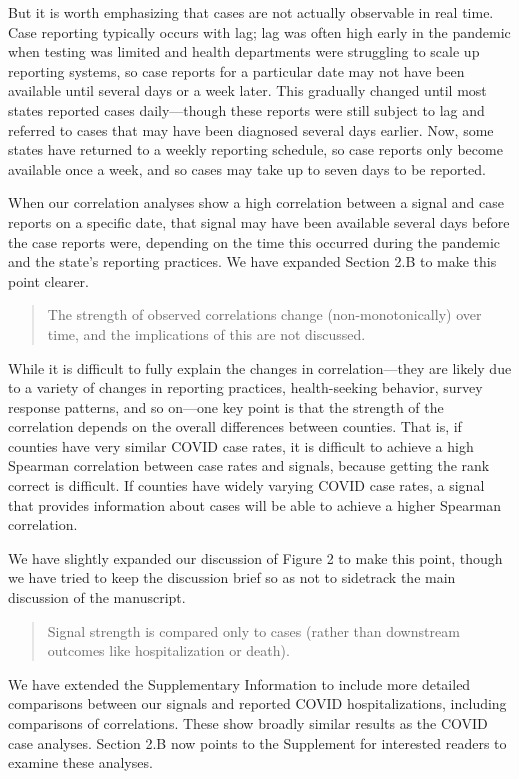 \documentclass[11pt]{article}
\begin{document}
But it is worth emphasizing that cases are not actually observable in real time.
Case reporting typically occurs with lag; lag was often high early in the
pandemic when testing was limited and health departments were struggling to
scale up reporting systems, so case reports for a particular date may not have
been available until several days or a week later. This gradually changed until
most states reported cases daily---though these reports were still subject to
lag and referred to cases that may have been diagnosed several days earlier.
Now, some states have returned to a weekly reporting schedule, so case reports
only become available once a week, and so cases may take up to seven days to be
reported.

When our correlation analyses show a high correlation between a signal and case
reports on a specific date, that signal may have been available several days
before the case reports were, depending on the time this occurred during the
pandemic and the state's reporting practices. We have expanded Section 2.B to
make this point clearer.

\begin{quote}
  The strength of observed correlations change (non-monotonically) over time,
  and the implications of this are not discussed.
\end{quote}
While it is difficult to fully explain the changes in correlation---they are
likely due to a variety of changes in reporting practices, health-seeking
behavior, survey response patterns, and so on---one key point is that the
strength of the correlation depends on the overall differences between counties.
That is, if counties have very similar COVID case rates, it is difficult to
achieve a high Spearman correlation between case rates and signals, because
getting the rank correct is difficult. If counties have widely varying COVID
case rates, a signal that provides information about cases will be able to
achieve a higher Spearman correlation.

We have slightly expanded our discussion of Figure 2 to make this point, though
we have tried to keep the discussion brief so as not to sidetrack the main
discussion of the manuscript.

\begin{quote}
  Signal strength is compared only to cases (rather than downstream outcomes
  like hospitalization or death).
\end{quote}
We have extended the Supplementary Information to include more detailed
comparisons between our signals and reported COVID hospitalizations, including
comparisons of correlations. These show broadly similar results as the COVID
case analyses. Section 2.B now points to the Supplement for interested readers
to examine these analyses.
\end{document}
